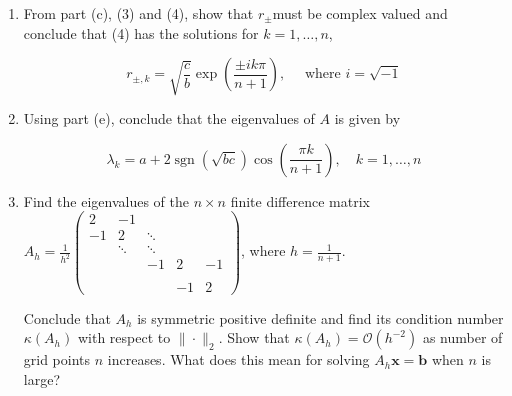 \documentclass{report}
\begin{document}
{\begin{enumerate}[label=(\alph*)]
		\item From part (c), (3) and (4), show that $r_{ \pm}$must be complex valued and conclude that (4) has the solutions for $k=1, \ldots, n$,

		      $$
			      r_{ \pm, k}=\sqrt{\frac{c}{b}} \exp \left(\frac{ \pm i k \pi}{n+1}\right), \quad \text { where } i=\sqrt{-1}
		      $$

		\item Using part (e), conclude that the eigenvalues of $A$ is given by

		      $$
			      \lambda_k=a+2 \operatorname{sgn}(\sqrt{b c}) \cos \left(\frac{\pi k}{n+1}\right), \quad k=1, \ldots, n
		      $$
		\item
		      Find the eigenvalues of the $n \times n$ finite difference matrix $A_h=\frac{1}{h^2}\left(\begin{array}{ccccc}2 & -1 & && \\ -1 & 2 & \ddots&&  \\ & \ddots & \ddots \\ &&-1&2&-1 \\   &&\\ &&&-1&2 \end{array}\right)$, where $h=\frac{1}{n+1}$.

		      Conclude that $A_h$ is symmetric positive definite and find its condition number $\kappa\left(A_h\right)$ with respect to $\|\cdot\|_2$. Show that $\kappa\left(A_h\right)=\mathcal{O}\left(h^{-2}\right)$ as number of grid points $n$ increases. What does this mean for solving $A_h \boldsymbol{x}=\boldsymbol{b}$ when $n$ is large?

	\end{enumerate}
}
\end{document}
